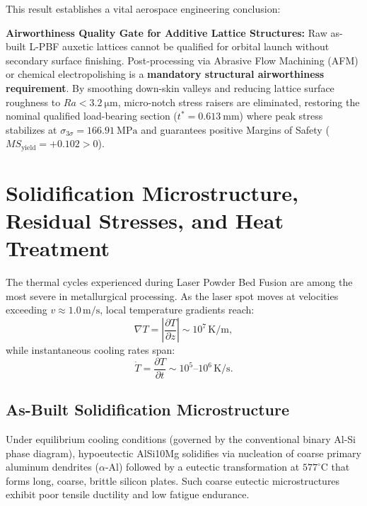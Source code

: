 This result establishes a vital aerospace engineering conclusion:
\begin{svgraybox}
\textbf{Airworthiness Quality Gate for Additive Lattice Structures:}
Raw as-built L-PBF auxetic lattices cannot be qualified for orbital launch without secondary surface finishing. Post-processing via Abrasive Flow Machining (AFM) or chemical electropolishing is a \textbf{mandatory structural airworthiness requirement}. By smoothing down-skin valleys and reducing lattice surface roughness to $Ra < \SI{3.2}{\micro\meter}$, micro-notch stress raisers are eliminated, restoring the nominal qualified load-bearing section ($t^* = \SI{0.613}{\milli\meter}$) where peak stress stabilizes at $\sigma_{3\sigma} = \SI{166.91}{\mega\pascal}$ and guarantees positive Margins of Safety ($MS_{\text{yield}} = \mathbf{+0.102} > 0$).
\end{svgraybox}

\section{Solidification Microstructure, Residual Stresses, and Heat Treatment}
\label{sec:microstructure_heat_treatment}

The thermal cycles experienced during Laser Powder Bed Fusion are among the most severe in metallurgical processing. As the laser spot moves at velocities exceeding $v \approx 1.0\,\text{m/s}$, local temperature gradients reach:
\begin{equation}
\nabla T = \left|\frac{\partial T}{\partial z}\right| \sim 10^7\,\text{K/m},
\label{eq:thermal_gradient}
\end{equation}
while instantaneous cooling rates span:
\begin{equation}
\dot{T} = \frac{\partial T}{\partial t} \sim 10^5\text{--}10^6\,\text{K/s}.
\label{eq:cooling_rate}
\end{equation}

\subsection{As-Built Solidification Microstructure}
Under equilibrium cooling conditions (governed by the conventional binary Al-Si phase diagram), hypoeutectic AlSi10Mg solidifies via nucleation of coarse primary aluminum dendrites ($\alpha$-Al) followed by a eutectic transformation at $577^\circ\text{C}$ that forms long, coarse, brittle silicon plates. Such coarse eutectic microstructures exhibit poor tensile ductility and low fatigue endurance.

